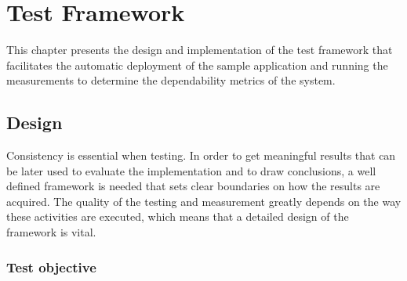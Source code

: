 \chapter{Test Framework} \label{test-framework}

This chapter presents the design and implementation of the test framework that facilitates the automatic deployment of the sample application and running the measurements to determine the dependability metrics of the system.

\section{Design}

Consistency is essential when testing. In order to get meaningful results that can be later used to evaluate the implementation and to draw conclusions, a well defined framework is needed that sets clear boundaries on how the results are acquired. The quality of the testing and measurement greatly depends on the way these activities are executed, which means that a detailed design of the framework is vital.

%	

\subsection{Test objective} \label{test-design-objective}

